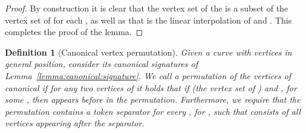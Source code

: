 \documentclass[11pt, letter]{article}
\newtheorem{definition}[theorem]{Definition}
\newcommand{\lemref}[1]{Lemma~\ref{lemma:#1}}
\newcommand{\deflab}[1]{\label{def:#1}}
\begin{document}
\begin{proof}
By construction it is clear that the vertex set of the   is a subset of the vertex set of  for each , as well as that  is the linear interpolation of  and . This completes the proof of the lemma.  
\end{proof}

\begin{definition}[Canonical vertex permutation]
\deflab{vtx:permutation}
Given a curve  with  vertices in general position, consider its canonical signatures  of \lemref{canonical:signature}. We call a permutation of the vertices of  canonical if for any two vertices  of  it holds that if  (the vertex set of ) and , for some , then  appears before  in the permutation. Furthermore, we require that the permutation contains a token separator for every , for , such that  consists of all vertices appearing after the separator.
\end{definition}
\end{document}

